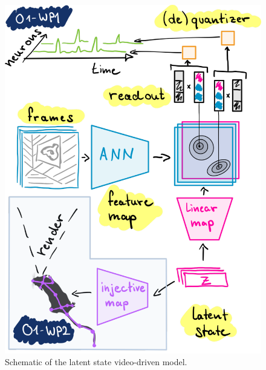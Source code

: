 \documentclass[B2,COG]{ercgrant}
\begin{document}
\begin{figure}
\includegraphics[width=\linewidth]{figures/model.pdf}
\caption{Schematic of the latent state video-driven model.}
\label{fig:model}
\end{figure}
 
\end{document}
